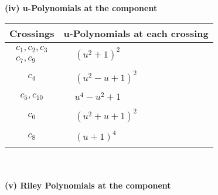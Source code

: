 \documentclass[1p]{elsarticle_modified}
\theoremstyle{definition}
\begin{document}
\newpage\renewcommand{\arraystretch}{1}
\flushleft \textbf{(iv) u-Polynomials at the component}\newline \\
\begin{tabular}{m{50pt}|m{274pt}}
Crossings & \hspace{64pt}u-Polynomials at each crossing \\
\hline $$\begin{aligned}c_{1},c_{2},c_{3}\\c_{7},c_{9}\end{aligned}$$&$\begin{aligned}
&(u^2+1)^2
\end{aligned}$\\
\hline $$\begin{aligned}c_{4}\end{aligned}$$&$\begin{aligned}
&(u^2- u+1)^2
\end{aligned}$\\
\hline $$\begin{aligned}c_{5},c_{10}\end{aligned}$$&$\begin{aligned}
&u^4- u^2+1
\end{aligned}$\\
\hline $$\begin{aligned}c_{6}\end{aligned}$$&$\begin{aligned}
&(u^2+u+1)^2
\end{aligned}$\\
\hline $$\begin{aligned}c_{8}\end{aligned}$$&$\begin{aligned}
&(u+1)^4
\end{aligned}$\\
\hline
\end{tabular}\\~\\
\newpage\renewcommand{\arraystretch}{1}
\flushleft \textbf{(v) Riley Polynomials at the component}\newline \\
\end{document}
